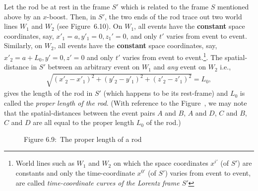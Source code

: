 Let the rod be at rest in the frame $S'$ which is 
related to 
the frame $S$ mentioned above by an $x$-boost. Then, 
in 
$S'$, the two ends of the rod trace out two world 
lines 
$W_1$ and $W_2$ (see Figure~6.10). On $W_1$, all events 
have 
the \textbf{constant} space coordinates, say,  
$x'_1=a,y'_1=0,z_1'=0$, and only $t'$ varies from event 
to 
event.  Similarly, on $W_2$, all events have the  
\textbf{constant} space coordinates, say, $x'_2=a+L_0, 
y'=0,z'=0$ and only $t'$ varies from event to 
event.\footnote{World lines such as $W_1$ and $W_2$ on 
which the space coordinates $x^{i'}$ (of $S'$) are 
constants and only the time-coordinate $x^{0'}$ (of 
$S'$) varies from event to event, are called 
\textsl{time-coordinate curves of the Lorentz frame 
$S'$}}. 
The spatial-distance in $S'$ between an arbitrary event 
on 
$W_1$ and \textsl{any} event on $W_2$ i.e., 
\begin{align*}
\sqrt{(x'_2-x'_1)^2+(y'_2-y'_1)^2+(z'_2-z'_1)^2}=L_0, 
\end{align*}
gives the length of the rod in $S'$ (which happens to 
be its 
rest-frame) and $L_0$ is called  the \textsl{proper 
length 
of the rod}.  (With reference to the 
Figure~, 
we may note that the spatial-distances between the 
event 
pairs $A$ and $B$, $A$ and  $D$,  $C$ and $B$, $C$ and 
$D$ 
are all equal to the proper length $L_0$ of the rod.)
\begin{figure}[H]
\begin{center}
\end{center}
\caption*{Figure 6.9:~The proper length of a rod}\label{fig6.9}
\end{figure}

